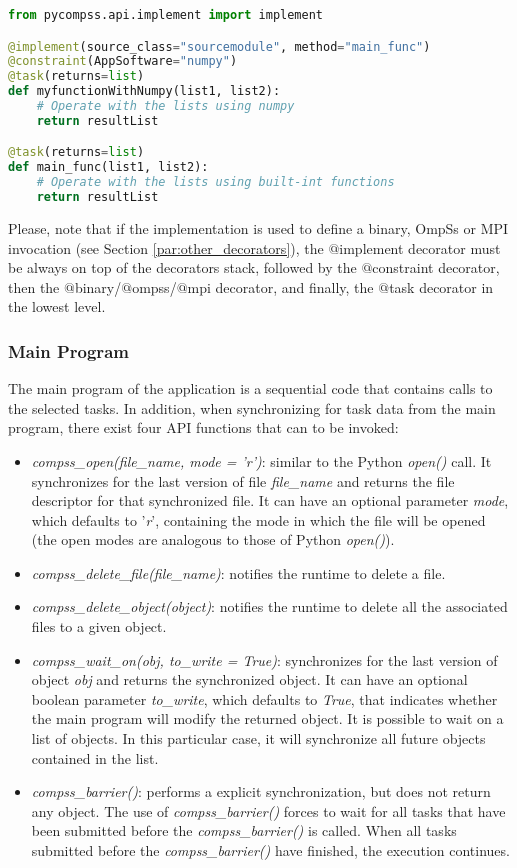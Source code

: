 \begin{lstlisting}[language=python]
from pycompss.api.implement import implement

@implement(source_class="sourcemodule", method="main_func")
@constraint(AppSoftware="numpy")
@task(returns=list)
def myfunctionWithNumpy(list1, list2):
    # Operate with the lists using numpy
    return resultList

@task(returns=list)
def main_func(list1, list2):
    # Operate with the lists using built-int functions
    return resultList
\end{lstlisting}

Please, note that if the implementation is used to define a binary, OmpSs or MPI invocation (see Section 
\ref{par:other_decorators}), the $@$implement decorator must be always on top of the decorators stack,
followed by the $@$constraint decorator, then the $@$binary/$@$ompss/$@$mpi decorator, and finally, 
the $@$task decorator in the lowest level.

\subsubsection{Main Program}
The main program of the application is a sequential code that contains calls to the selected tasks. 
In addition, when synchronizing for task data from the main program, 
there exist four API functions that can to be invoked:

\begin{itemize}
 \item {\it compss\_open(file\_name, mode = 'r')}: similar to the Python {\it open()} call. It synchronizes
       for the last version of file {\it file\_name} and returns the file descriptor for that synchronized
       file. It can have an optional parameter {\it mode}, which defaults to '{\it r}', containing the
       mode in which the file will be opened (the open modes are analogous to those of
       Python {\it open()}).
 \item {\it compss\_delete\_file(file\_name)}: notifies the runtime to delete a file.
 \item {\it compss\_delete\_object(object)}: notifies the runtime to delete all the associated files to
 a given object.
 \item {\it compss\_wait\_on(obj, to\_write = True)}: synchronizes for the last version of object {\it obj}
       and returns the synchronized object. It can have an optional boolean parameter
       {\it to\_write}, which defaults to {\it True}, that indicates whether the main program will modify the
       returned object.       
       It is possible to wait on a list of objects. In this particular case, it will synchronize all future objects 
       contained in the list.
 \item {\it compss\_barrier()}: performs a explicit synchronization, but does not return any object. The use of {\it compss\_barrier()}
       forces to wait for all tasks that have been submitted before the {\it compss\_barrier()} is called.
       When all tasks submitted before the {\it compss\_barrier()} have finished, the execution continues.
\end{itemize}

